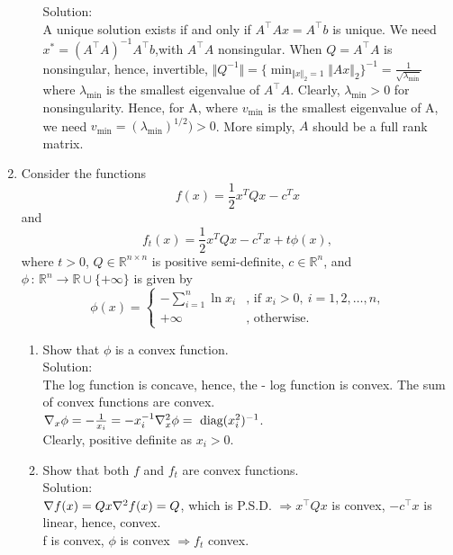\documentclass[12pt]{amsart}
\newcommand{\norm}[1]{\Vert #1 \Vert}
\newcommand{\R}{{\mathbb{R}}}
\newcommand{\grad}{\nabla}
\newcommand{\tpose}[1]{#1^{\scriptscriptstyle T}}
\begin{document}
\begin{enumerate}
\begin{enumerate}
Solution:\\
A unique solution exists if and only if $A^\top Ax = A^\top b$ is unique.  We need $x^* = (A^\top A)^{-1} A^\top b$,with $A^\top A$ nonsingular.  When $Q = A^\top A$ is nonsingular, hence, invertible, $\displaystyle \norm{Q^{-1}} = \{\min_{\norm{x}_2=1}  \norm{Ax}_2\}^{-1} =  \frac{1}{\sqrt{\lambda_{\min}}}$ where $\lambda_{\min}$ is the smallest eigenvalue of $A^\top A$.  Clearly, $\lambda_{\min} > 0$ for nonsingularity.  Hence, for A, where $v_{\min}$ is the smallest eigenvalue of A, we need $v_{\min} = (\lambda_{\min})^{1/2}) > 0$.  More simply, $A$ should be a full rank matrix.\\


\end{enumerate}
\item
Consider the functions
$$f(x)=\frac{1}{2} \tpose{x} Q x -\tpose{c}x $$
and
$$
f_t(x)=\frac{1}{2} \tpose{x} Q x -\tpose{c}x +t\phi(x),
$$
where $t>0$, $Q\in\R^{n\times n}$ is positive semi-definite,
$c\in\R^n$, and $\phi\, :\, \R^n\rightarrow\R\cup\{+\infty\}$
is given by
$$
\phi(x)=\left\{\begin{array}{ll}
-\sum_{i=1}^n\ln x_i&\mbox{, if $x_i> 0,\ i=1,2,\dots ,n$,}\\
+\infty&\mbox{, otherwise.}\end{array}\right.
$$
\begin{enumerate}
\item
Show that $\phi$ is a convex function. \\

\noindent
Solution:\\
The log function is concave, hence, the - log function is convex.  The sum of convex functions are convex. \\
$\grad_x \phi = -\frac{1}{x_i} = - x_i^{-1} \\
\grad_x^2 \phi = \text{ diag}(x_i^2)^{-1}$.\\
Clearly, positive definite as $x_i > 0$.  \\

\item
Show that both $f$ and $f_t$ are convex functions. \\

\noindent
Solution:\\
$\grad f(x) = Qx \\
\grad^2 f(x) = Q$, which is P.S.D. $\Rightarrow x^\top Qx$ is convex, $-c^\top x$ is linear, hence, convex. \\
f is convex, $\phi$ is convex $\Rightarrow f_t$ convex. \\


\end{enumerate}
\end{enumerate}
\end{document}
